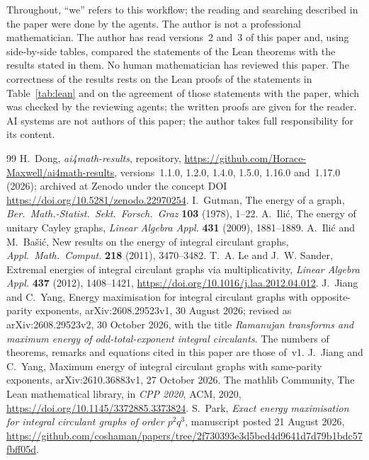 \documentclass[11pt]{article}
\theoremstyle{remark}
\newcommand{\repoversion}{1.17.0}
\begin{document}
Throughout, ``we'' refers to this workflow; the reading and searching described in
the paper were done by the agents. The author is not a professional mathematician.
The author has read versions~2 and~3 of this paper and, using side-by-side tables,
compared the statements of the Lean theorems with the results stated in them.
No human mathematician has reviewed this paper. The correctness of the results rests
on the Lean proofs of the statements in Table~\ref{tab:lean} and on the agreement of
those statements with the paper, which was checked by the reviewing agents; the
written proofs are given for the reader. AI systems are not authors of this paper; the
author takes full responsibility for its content.

\begin{thebibliography}{99}
H.~Dong, \emph{ai4math-results}, repository,
\url{https://github.com/Horace-Maxwell/ai4math-results}, versions~1.1.0, 1.2.0,
1.4.0, 1.5.0, 1.16.0 and~\repoversion{} (2026); archived at Zenodo under the concept DOI
\url{https://doi.org/10.5281/zenodo.22970254}.
I.~Gutman, The energy of a graph, \emph{Ber.\ Math.-Statist.\ Sekt.\
Forsch.\ Graz} \textbf{103} (1978), 1--22.
A.~Ili\'c, The energy of unitary Cayley graphs, \emph{Linear Algebra Appl.}
\textbf{431} (2009), 1881--1889.
A.~Ili\'c and M.~Ba\v{s}i\'c, New results on the energy of integral circulant
graphs, \emph{Appl.\ Math.\ Comput.} \textbf{218} (2011), 3470--3482.
\bibitem{lesander}
T.~A. Le and J.~W. Sander, Extremal energies of integral circulant graphs via
multiplicativity, \emph{Linear Algebra Appl.} \textbf{437} (2012), 1408--1421,
\url{https://doi.org/10.1016/j.laa.2012.04.012}.
J.~Jiang and C.~Yang, Energy maximisation for integral circulant graphs with
opposite-parity exponents, arXiv:2608.29523v1, 30 August 2026; revised as
arXiv:2608.29523v2, 30 October 2026, with the title \emph{Ramanujan transforms and
maximum energy of odd-total-exponent integral circulants}. The numbers of
theorems, remarks and equations cited in this paper are those of~v1.
\bibitem{jy2}
J.~Jiang and C.~Yang, Maximum energy of integral circulant graphs with
same-parity exponents, arXiv:2610.36883v1, 27 October 2026.
The mathlib Community, The Lean mathematical library, in \emph{CPP 2020},
ACM, 2020, \url{https://doi.org/10.1145/3372885.3373824}.
S.~Park, \emph{Exact energy maximisation for integral circulant graphs of
order $p^2q^3$}, manuscript posted 21 August 2026,
\url{https://github.com/coshaman/papers/tree/2f730393e3d5bed4d9641d7d79b1bdc57fbff05d}.

\end{thebibliography}
\end{document}
